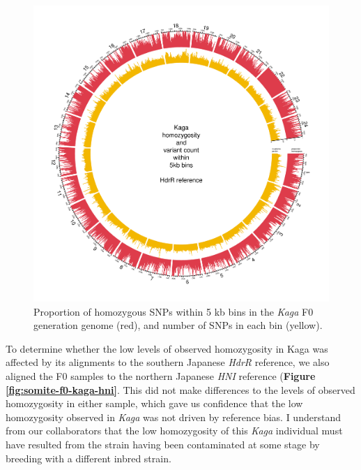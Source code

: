 \documentclass[
]{book}
\begin{document}
\begin{figure}
\includegraphics[width=1\linewidth]{figs/somites/Kaga} \caption{Proportion of homozygous SNPs within 5 kb bins in the \emph{Kaga} F0 generation genome (red), and number of SNPs in each bin (yellow).}\label{fig:somite-f0-kaga}
\end{figure}

To determine whether the low levels of observed homozygosity in Kaga was affected by its alignments to the southern Japanese \emph{HdrR} reference, we also aligned the F0 samples to the northern Japanese \emph{HNI} reference (\textbf{Figure \ref{fig:somite-f0-kaga-hni}}. This did not make differences to the levels of observed homozygosity in either sample, which gave us confidence that the low homozygosity observed in \emph{Kaga} was not driven by reference bias. I understand from our collaborators that the low homozygosity of this \emph{Kaga} individual must have resulted from the strain having been contaminated at some stage by breeding with a different inbred strain.
\end{document}
